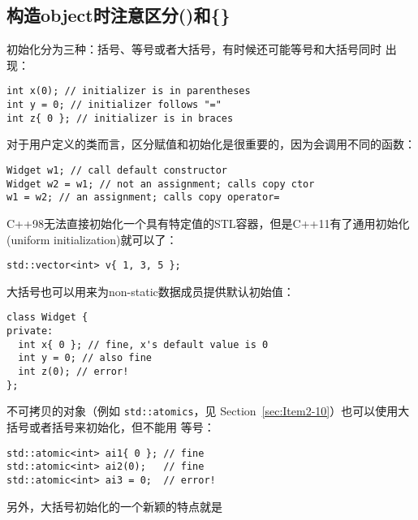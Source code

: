 \message{ !name(../CppLearning.tex)}\documentclass[a4paper,twoside]{article}
\theoremstyle{definition}
\theoremstyle{remark}
\numberwithin{equation}{section}
\let\OldTexttt\texttt
\renewcommand{\texttt}[1]{{\color{blue} \OldTexttt{#1}}}
\begin{document}
\subsection{构造object时注意区分()和\{\}}
\label{sec:Item2-7}

初始化分为三种：括号、等号或者大括号，有时候还可能等号和大括号同时
出现：
\begin{verbatim}
int x(0); // initializer is in parentheses
int y = 0; // initializer follows "="
int z{ 0 }; // initializer is in braces
\end{verbatim}

对于用户定义的类而言，区分赋值和初始化是很重要的，因为会调用不同的函数：
\begin{verbatim}
Widget w1; // call default constructor
Widget w2 = w1; // not an assignment; calls copy ctor
w1 = w2; // an assignment; calls copy operator=
\end{verbatim}

C++98无法直接初始化一个具有特定值的STL容器，但是C++11有了通用初始化
(uniform initialization)就可以了：
\begin{verbatim}
std::vector<int> v{ 1, 3, 5 };
\end{verbatim}

大括号也可以用来为non-static数据成员提供默认初始值：
\begin{verbatim}
class Widget {
private:
  int x{ 0 }; // fine, x's default value is 0
  int y = 0; // also fine
  int z(0); // error!
};
\end{verbatim}

不可拷贝的对象（例如\texttt{std::atomics}，见
Section~\ref{sec:Item2-10}）也可以使用大括号或者括号来初始化，但不能用
等号：
\begin{verbatim}
std::atomic<int> ai1{ 0 }; // fine
std::atomic<int> ai2(0);   // fine
std::atomic<int> ai3 = 0;  // error!
\end{verbatim}

另外，大括号初始化的一个新颖的特点就是


\end{document}
